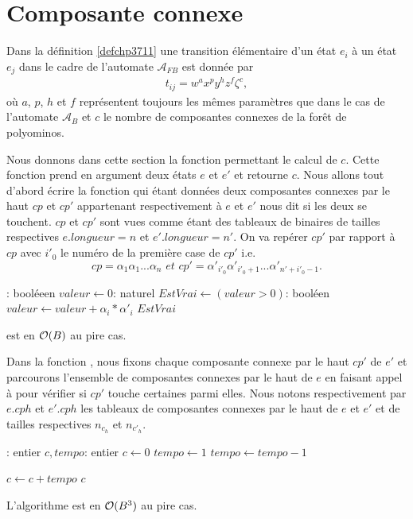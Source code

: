  \section{Composante connexe}
 Dans la définition \ref{defchp3711}  une transition élémentaire d'un état $e_{i}$ à un état $e_{j}$ dans le  cadre de l'automate $\mathcal{A}_{FB}$ est donnée par  \begin{eqnarray*}
t_{ij} = w^{a}x^{p}y^{h}z^{f}\zeta^{c},
\end{eqnarray*}
où $a$, $p$, $h$ et $f$ représentent toujours les mêmes paramètres que dans le cas de l'automate $\mathcal{A}_{B}$ et $c$ le nombre de composantes connexes de la forêt de polyominos.

 Nous donnons dans cette section la fonction  permettant le calcul de $c$. Cette fonction prend en argument deux états $e$ et $e'$ et retourne $c$. Nous allons tout d'abord écrire la fonction  qui étant données deux composantes connexes  par le haut $cp$ et $cp'$ appartenant respectivement à $e$ et $e'$ nous dit si les deux se touchent. $cp$ et $cp'$ sont vues comme étant des tableaux de binaires de tailles respectives $e.longueur=n$ et $e'.longueur=n'$. On va repérer   $cp'$ par rapport à $cp$ avec $i'_{0}$ le numéro de la première case de $cp'$ i.e.
 $$ cp   =\alpha_{1}\alpha_{1}...\alpha_{n} \textit{ et } cp' =\alpha'_{i'_{0}}\alpha'_{i'_{0}+1}...\alpha'_{n'+i'_{0}-1}.$$

\begin{algorithmic}[1]
      : booléeen
         \State $valeur\leftarrow 0$: naturel
         \State $EstVrai\leftarrow (valeur>0)$: booléen 
             \State $valeur\leftarrow valeur + \alpha_{i}*\alpha'_{i} $
          \EndFor
      \State \Return $EstVrai$
   \EndFunction
  \end{algorithmic}  
  est en $\mathcal{O} (B)$ au pire cas.
 
 Dans la fonction , nous fixons chaque composante connexe par le haut $cp'$ de $e'$ et parcourons l'ensemble de composantes connexes  par le haut de $e$ en faisant appel à  pour vérifier si $cp'$  touche certaines parmi elles. Nous notons respectivement  par $e.cph$ et $e'.cph$ les tableaux de composantes connexes  par le haut de $e$ et $e'$ et de tailles respectives $n_{c_{h}}$ et $n_{c'_{h}}$.
 \begin{algorithmic}[1]
  : entier
   \State $c, tempo$: entier
   \State $c\leftarrow 0$
         \State $tempo \leftarrow 1$
                  \State $tempo \leftarrow tempo -1$
             \EndIf
         
         \EndFor
         \State $c\leftarrow c + tempo$
    \EndFor
   \State \Return $c$
  \EndFunction
 \end{algorithmic}  
 L'algorithme  est en $\mathcal{O}(B^{3})$ au pire cas.\\
  
